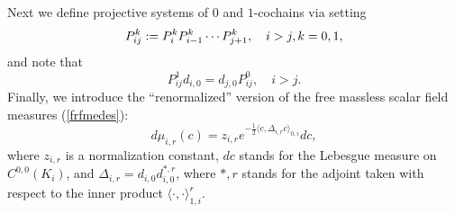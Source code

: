 \documentclass[11pt,reqno]{amsart}
\numberwithin{equation}{section}
\theoremstyle{remark}
\theoremstyle{rmdefinition}
\begin{document}
Next we define projective systems of $0$ and $1$-cochains via setting
$$P^k_{ij}:=P^k_{i} P^k_{i-1} \cdots  P^k_{j+1}, \quad i>j, \\ k=0,1,$$
and note that 
\begin{equation}\label{cochamapcoij}
P^1_{ij}d_{i,0} =d_{j,0} P^0_{ij}, \quad i>j.
\end{equation}
Finally, we introduce the ``renormalized'' version of the free massless  scalar field measures (\ref{frfmedes}):
\begin{equation}\label{frfmedestwo}
	d\mu_{i,r}(c)=z_{i,r} e^{-\frac{1}{2}\langle c, \Delta_{i,r} c\rangle _{0,i}} d c,
\end{equation}
 where $z_{i,r}$ is a normalization constant, $dc$ stands for the Lebesgue measure on $C^{0,0}(K_i)$, and  $\Delta_{i,r}=d_{i,0}d^{*,r}_{i,0}$, where $*,r$ stands for the adjoint taken with respect to the inner product $\langle \cdot, \cdot \rangle_{1,i}^r$.
\end{document}
